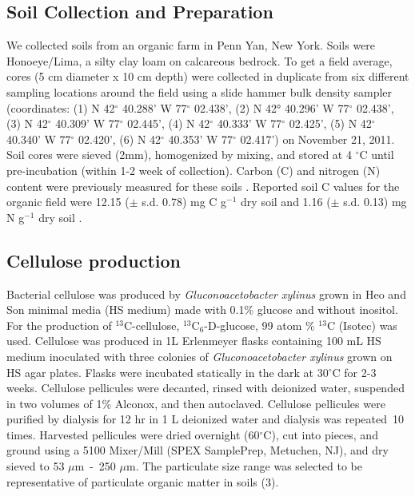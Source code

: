\documentclass{article}
\begin{document}
\subsection{Soil Collection and Preparation} 
We collected soils from an organic farm in Penn Yan, New York. Soils were
Honoeye/Lima, a silty clay loam on calcareous bedrock. To get a field average,
cores (5 cm diameter x 10 cm depth) were collected in duplicate from six
different sampling locations around the field using a slide hammer bulk density
sampler (coordinates: (1) N 42$^{\circ}$ 40.288’ W 77$^{\circ}$ 02.438’, (2)
N 42° 40.296’ W 77$^{\circ}$ 02.438’, (3) N 42$^{\circ}$ 40.309’ W 77$^{\circ}$
02.445’, (4) N 42$^{\circ}$ 40.333’ W 77$^{\circ}$ 02.425’, (5) N 42$^{\circ}$
   40.340’ W 77$^{\circ}$ 02.420’, (6) N 42$^{\circ}$ 40.353’ W 77$^{\circ}$
      02.417’) on November 21,
2011. Soil cores were sieved (2mm), homogenized by mixing, and stored at
      4 $^{\circ}$C until pre-incubation (within 1-2 week of collection).
        Carbon (C) and nitrogen (N) content were previously measured for these
        soils \citep{Berthrong_2013}. Reported soil C values for the organic
        field were
12.15 ($\pm$ s.d. 0.78) mg C g$^{-1}$ dry soil and 1.16 ($\pm$ s.d. 0.13) mg
   N g$^{-1}$ dry soil \citep{Berthrong_2013}. 

\subsection{Cellulose production}
Bacterial cellulose was produced by \textit{Gluconoacetobacter xylinus} grown
in Heo and Son \citep{Heo_2002} minimal media (HS medium) made with 0.1\%
glucose and without inositol.  For the production of $^{13}$C-cellulose,
$^{13}$C$_{6}$-D-glucose, 99 atom \% $^{13}$C (Isotec) was used. Cellulose
was produced in 1L Erlenmeyer flasks containing 100 mL HS medium inoculated
with three colonies of \textit{Gluconoacetobacter xylinus} grown on HS agar
plates. Flasks were incubated statically in the dark at 30$^{\circ}$C for 2-3
weeks. Cellulose pellicules were decanted, rinsed with deionized water,
suspended in two volumes of 1\% Alconox, and then autoclaved. Cellulose
pellicules were purified by dialysis for 12 hr in 1 L deionized water and
dialysis was repeated~10 times. Harvested pellicules were dried overnight
(60$^{\circ}$C), cut into pieces, and ground using a 5100 Mixer/Mill (SPEX
SamplePrep, Metuchen, NJ), and dry sieved to 53 $\mu$m - 250 $\mu$m. The particulate
size range was selected to be representative of particulate organic matter in
soils (3).
\end{document}
